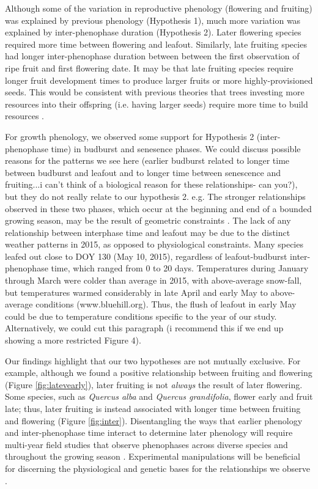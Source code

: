 \documentclass{article}
\begin{document}
\par Although some of the variation in reproductive phenology (flowering and fruiting) was explained by previous phenology (Hypothesis 1), much more variation was explained by inter-phenophase duration (Hypothesis 2). Later flowering species required more time between flowering and leafout. Similarly, late fruiting species had longer inter-phenophase duration between between the first observation of ripe fruit and first flowering date. It may be that late fruiting species require longer fruit development times to produce larger fruits or more highly-provisioned seeds. This would be consistent with previous theories that trees investing more resources into their offspring (i.e. having larger seeds) require more time to build resources \citep {bolmgren2008,sun2011}.

\par For growth phenology, we observed some support for Hypothesis 2 (inter-phenophase time) in budburst and senesence phases. We could discuss possible reasons for the patterns we see here (earlier budburst related to longer time between budburst and leafout and to longer time between senescence and fruiting...i can't think of a biological reason for these relationships- can you?), but they do not really relate to our hypothesis 2.  e.g. The stronger relationships observed in these two phases, which occur at the beginning and end of a bounded growing season, may be the result of geometric constraints \citep{letten2013}. The lack of any relationship between interphase time and leafout may be due to the distinct weather patterns in 2015, as opposed to physiological constraints. Many species leafed out close to DOY 130 (May 10, 2015), regardless of leafout-budburst inter-phenophase time, which ranged from 0 to 20 days. Temperatures during January through March were colder than average in 2015, with above-average snow-fall, but temperatures warmed considerably in late April and early May to above-average conditions (www.bluehill.org). Thus, the flush of leafout in early May could be due to temperature conditions specific to the year of our study. Alternatively, we could cut this paragraph (i recommend this if we end up showing a more restricted Figure 4).

\par Our findings highlight that our two hypotheses are not mutually exclusive. For example, although we found a positive relationship between fruiting and flowering (Figure \ref{fig:latevearly}), later fruiting is not \textit{always} the result of later flowering. Some species, such as \emph{Quercus alba} and \emph{Quercus grandifolia}, flower early and fruit late; thus, later fruiting is instead associated with longer time between fruiting and flowering (Figure \ref{fig:inter}). Disentangling the ways that earlier phenology and inter-phenophase time interact to determine later phenology will require multi-year field studies that observe phenophases across diverse species and throughout the growing season \citep[e.g.][]{elmendorf2016}. Experimental manipulations will be beneficial for discerning the physiological and genetic bases for the relationships we observe \citep{flint1974}.
\end{document}
